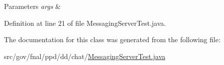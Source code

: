 \begin{DoxyParams}{Parameters}
{\em args} & \\
\hline
\end{DoxyParams}


Definition at line 21 of file Messaging\-Server\-Test.\-java.



The documentation for this class was generated from the following file\-:\begin{DoxyCompactItemize}
\item 
src/gov/fnal/ppd/dd/chat/\hyperlink{MessagingServerTest_8java}{Messaging\-Server\-Test.\-java}\end{DoxyCompactItemize}
